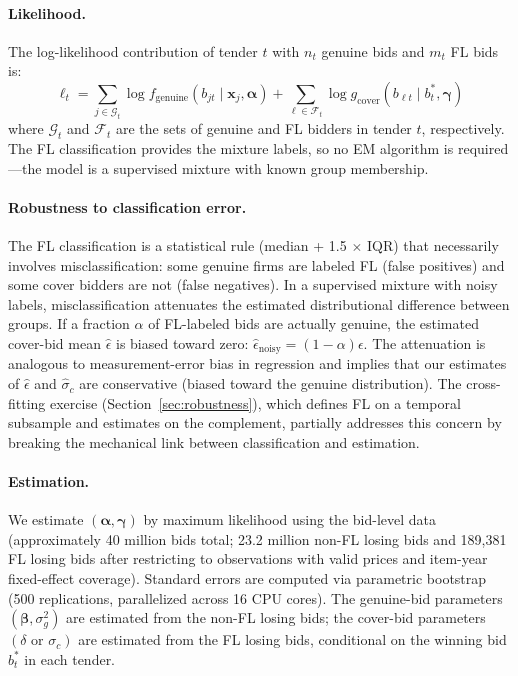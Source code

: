 \paragraph{Likelihood.} The log-likelihood contribution of tender $t$
with $n_t$ genuine bids and $m_t$ FL bids is:
\begin{equation}
  \ell_t = \sum_{j \in \mathcal{G}_t} \log f_{\text{genuine}}(b_{jt}
  \mid \mathbf{x}_j, \boldsymbol{\alpha})
  + \sum_{\ell \in \mathcal{F}_t} \log g_{\text{cover}}(b_{\ell t}
  \mid b^*_t, \boldsymbol{\gamma})
  \label{eq:loglik}
\end{equation}
where $\mathcal{G}_t$ and $\mathcal{F}_t$ are the sets of genuine and
FL bidders in tender $t$, respectively. The FL classification provides
the mixture labels, so no EM algorithm is required---the model is a
supervised mixture with known group membership.

\paragraph{Robustness to classification error.} %
The FL classification is a statistical rule (median + 1.5 $\times$ IQR)
that necessarily involves misclassification: some genuine firms are
labeled FL (false positives) and some cover bidders are not (false
negatives). In a supervised mixture with noisy labels, misclassification
attenuates the estimated distributional difference between groups. If
a fraction $\alpha$ of FL-labeled bids are actually genuine, the
estimated cover-bid mean $\hat{\epsilon}$ is biased toward zero:
$\hat{\epsilon}_{\text{noisy}} = (1-\alpha) \epsilon$. The attenuation
is analogous to measurement-error bias in regression and implies that
our estimates of $\hat{\epsilon}$ and $\hat{\sigma}_c$ are conservative
(biased toward the genuine distribution). The cross-fitting exercise
(Section~\ref{sec:robustness}), which defines FL on a temporal subsample
and estimates on the complement, partially addresses this concern by
breaking the mechanical link between classification and estimation.

\paragraph{Estimation.} We estimate $(\boldsymbol{\alpha},
\boldsymbol{\gamma})$ by maximum likelihood using the bid-level data
(approximately 40 million bids total; 23.2 million non-FL losing bids
and 189,381 FL losing bids after restricting to observations with valid
prices and item-year fixed-effect coverage). Standard errors are
computed via parametric bootstrap (500 replications, parallelized
across 16 CPU cores). The genuine-bid parameters
$(\boldsymbol{\beta}, \sigma_g^2)$ are estimated from the non-FL
losing bids; the cover-bid parameters
$(\delta \text{ or } \sigma_c)$ are estimated from the FL losing
bids, conditional on the winning bid $b^*_t$ in each tender.

